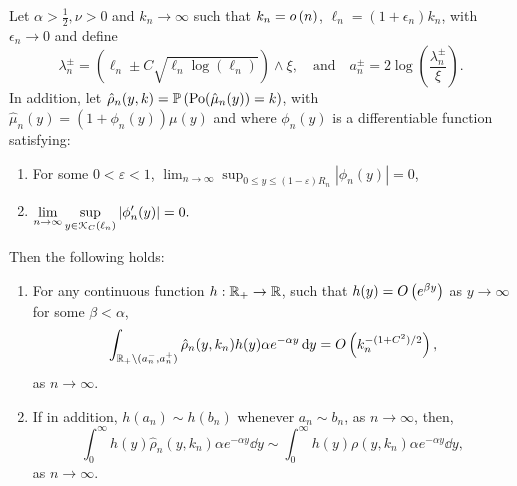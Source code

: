 \begin{lemma}\label{lem:concentration_argument_rho_approximation}
Let $\alpha > \frac{1}{2}, \nu > 0$ and $k_n \to \infty$ such that $k_n = o\left(n\right)$, $\ell_n = (1 + \epsilon_n)k_n$, with $\epsilon_n \to 0$ and define
\[
	\lambda_n^\pm = (\ell_n \pm C \sqrt{\ell_n \log(\ell_n)}) \wedge \xi, \quad \text{and} \quad a_n^\pm = 2 \log\left(\frac{\lambda_n^\pm}{\xi}\right).
\] 
In addition, let $\hat{\rho}_n(y,k) = \mathbb{P}\left({\mathrm{Po}}(\hat{\mu}_n(y)) = k\right)$, with $\hat{\mu}_n(y) = (1 + \phi_n(y))\mu(y)$ and 
where $\phi_n(y)$ is a differentiable function satisfying:
\begin{enumerate}[\upshape i)]
\item For some $0 < \varepsilon < 1$, $\displaystyle \lim_{n \to \infty} \sup_{0 \le y \le (1 - \varepsilon)R_n} |\phi_n(y)| = 0$,
\item $\displaystyle \lim_{n \to \infty}  \sup_{y \in {\mathcal K}_{C}(\ell_n)} |\phi_n^\prime(y)| = 0.$
\end{enumerate}
Then the following holds:
\begin{enumerate}
\item For any continuous function $h : {\mathbb R}_+ \rightarrow  {\ensuremath{\mathbb R}}$, such that $h(y) = O\left(e^{\beta y}\right)$ as $y \to \infty$ for some $\beta < \alpha$, 
\begin{equation}\label{eq:error_bound_int_rho_approx_not_K}
	\int_{{\mathbb R}_+ \setminus (a_n^-, a_n^+)} \hat{\rho}_n(y,k_n) h(y) \alpha e^{-\alpha y} \operatorname{\mathrm{d}\hspace{-2pt}} y
	= O\left(k_n^{-(1+C^2)/2}\right),
\end{equation}
as $n \to \infty$.
\item If in addition, $h(a_n) \sim h(b_n)$ whenever $a_n \sim b_n$, as $n \to \infty$, then,
\begin{equation}\label{eq:concentration_h_rho_approx}
	\int_0^\infty h(y) \hat{\rho}_n(y,k_n) \alpha e^{-\alpha y} \dd y \sim  
		\int_0^\infty h(y) \rho(y,k_n) \alpha e^{-\alpha y} \dd y,
\end{equation}
as $n \to \infty$.
\end{enumerate}
\end{lemma}

